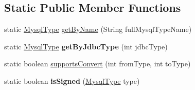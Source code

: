 \subsection*{Static Public Member Functions}
\begin{DoxyCompactItemize}
\item 
static \mbox{\hyperlink{enumcom_1_1mysql_1_1cj_1_1_mysql_type}{Mysql\+Type}} \mbox{\hyperlink{enumcom_1_1mysql_1_1cj_1_1_mysql_type_a3f47c0e41170018df1c9bd922c33ed40}{get\+By\+Name}} (String full\+Mysql\+Type\+Name)
\item 
\mbox{\label{enumcom_1_1mysql_1_1cj_1_1_mysql_type_ae37670e80313760fd00c339a1a6061cd}} 
static \mbox{\hyperlink{enumcom_1_1mysql_1_1cj_1_1_mysql_type}{Mysql\+Type}} {\bfseries get\+By\+Jdbc\+Type} (int jdbc\+Type)
\item 
static boolean \mbox{\hyperlink{enumcom_1_1mysql_1_1cj_1_1_mysql_type_a4b4c2fc4727e3e28c653e6cdfb2eaed5}{supports\+Convert}} (int from\+Type, int to\+Type)
\item 
\mbox{\label{enumcom_1_1mysql_1_1cj_1_1_mysql_type_ad098e2fae77d7c3619e5d2e25b47b1dd}} 
static boolean {\bfseries is\+Signed} (\mbox{\hyperlink{enumcom_1_1mysql_1_1cj_1_1_mysql_type}{Mysql\+Type}} type)
\end{DoxyCompactItemize}
